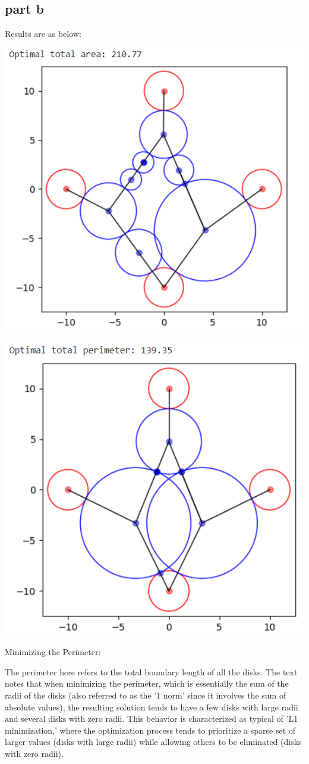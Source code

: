 \documentclass{uofa-eng-assignment}
\begin{document}
\subsection*{part b}

Results are as below:

\begin{center}
	\includegraphics[width=0.6\linewidth]{screenshot005}
\end{center}


\begin{center}
	\includegraphics[width=0.58\linewidth]{screenshot006}
\end{center}

Minimizing the Perimeter:

The perimeter here refers to the total boundary length of all the disks.
The text notes that when minimizing the perimeter, which is essentially the sum of the radii of the disks (also referred to as the '1 norm' since it involves the sum of absolute values), the resulting solution tends to have a few disks with large radii and several disks with zero radii.
This behavior is characterized as typical of 'L1 minimization,' where the optimization process tends to prioritize a sparse set of larger values (disks with large radii) while allowing others to be eliminated (disks with zero radii).
\end{document}
